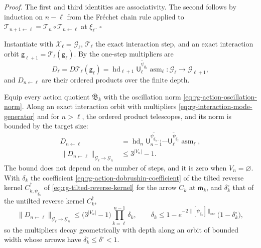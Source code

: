 \noindent\emph{Proof.}
The first and third identities are associativity. The second follows by induction
on $n-\ell$ from the Fr\'echet chain rule applied to $\mathcal
T_{n+1\leftarrow\ell}=\mathcal T_n\circ\mathcal T_{n\leftarrow\ell}$ at $\xi_\ell$.
$\square$

Instantiate  with $\mathscr X_\ell=\mathcal G_\ell$,
$\mathcal T_\ell$ the exact interaction step, and an exact interaction orbit
$\mathsf g_{\ell+1}=\mathcal T_\ell(\mathsf g_\ell)$. By
 the one-step multipliers are
\begin{equation}
D_\ell=D\mathcal T_\ell(\mathsf g_\ell)
=\operatorname{hd}_{\ell+1}\overline{\mathsf U_\ell^{\psi_{\mathsf g_\ell}}}\operatorname{asm}_\ell:
\mathcal G_\ell\longrightarrow\mathcal G_{\ell+1},
\label{eq:rg-interaction-mode-generator}
\end{equation}
and $D_{n\leftarrow\ell}$ are their ordered products over the finite depth.

Equip every action quotient $\overline{\mathfrak B}_k$ with the oscillation norm
\eqref{eq:rg-action-oscillation-norm}. Along an exact interaction orbit with
multipliers \eqref{eq:rg-interaction-mode-generator} and for $n>\ell$, the ordered
product telescopes, and its norm is bounded by the target size:
\begin{align}
D_{n\leftarrow\ell}
&=\operatorname{hd}_n\overline{\mathsf U_{n-1}^{\psi_{\mathsf g_{n-1}}}}\cdots
\overline{\mathsf U_\ell^{\psi_{\mathsf g_\ell}}}\operatorname{asm}_\ell,
\label{eq:rg-interaction-cocycle-telescoping}\\
\lVert D_{n\leftarrow\ell}\rVert_{\mathcal G_\ell\to\mathcal G_n}
&\le3^{\lvert V_n\rvert}-1 .
\label{eq:rg-interaction-native-growth-bound}
\end{align}
The bound does not depend on the number of steps, and it is zero when
$V_n=\varnothing$. With $\delta_k$ the coefficient \eqref{eq:rg-action-dobrushin-coefficient} of
the tilted reverse kernel $C^\dagger_{k,\psi_{\mathsf g_k}}$ of
\eqref{eq:rg-tilted-reverse-kernel} for the arrow $C_k$ at $\bar{\mathsf m}_k$, and $\delta^\circ_k$
that of the untilted reverse kernel $C^\dagger_k$,
\begin{equation}
\lVert D_{n\leftarrow\ell}\rVert_{\mathcal G_\ell\to\mathcal G_n}
\le\bigl(3^{\lvert V_n\rvert}-1\bigr)\prod_{k=\ell}^{n-1}\delta_k,
\qquad
\delta_k\le1-e^{-2\lVert[\psi_{\mathsf g_k}]\rVert_{\mathrm{osc}}}\bigl(1-\delta^\circ_k\bigr),
\label{eq:rg-interaction-dobrushin-growth-bound}
\end{equation}
so the multipliers decay geometrically with depth along an orbit of bounded width whose arrows
have $\delta^\circ_k\le\delta^\circ<1$. 

